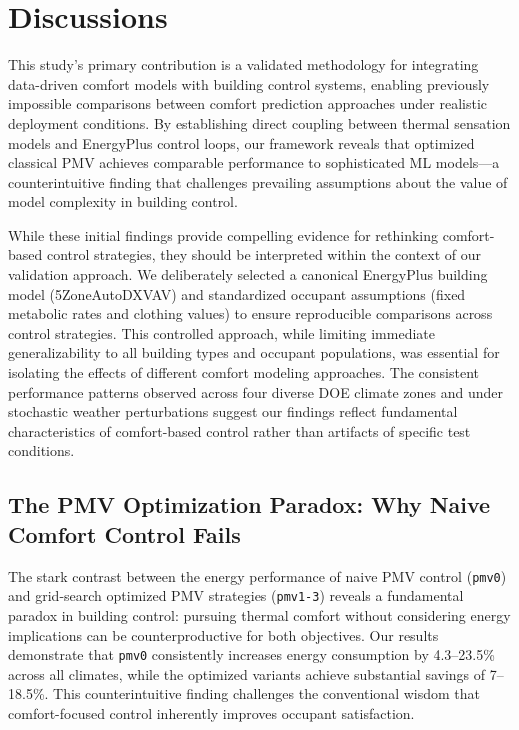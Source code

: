 \section{Discussions}
This study's primary contribution is a validated methodology for integrating data-driven comfort models with building control systems, enabling previously impossible comparisons between comfort prediction approaches under realistic deployment conditions. By establishing direct coupling between thermal sensation models and EnergyPlus control loops, our framework reveals that optimized classical PMV achieves comparable performance to sophisticated ML models—a counterintuitive finding that challenges prevailing assumptions about the value of model complexity in building control.

While these initial findings provide compelling evidence for rethinking comfort-based control strategies, they should be interpreted within the context of our validation approach. We deliberately selected a canonical EnergyPlus building model (5ZoneAutoDXVAV) and standardized occupant assumptions (fixed metabolic rates and clothing values) to ensure reproducible comparisons across control strategies. This controlled approach, while limiting immediate generalizability to all building types and occupant populations, was essential for isolating the effects of different comfort modeling approaches. The consistent performance patterns observed across four diverse DOE climate zones and under stochastic weather perturbations suggest our findings reflect fundamental characteristics of comfort-based control rather than artifacts of specific test conditions.

\subsection{The PMV Optimization Paradox: Why Naive Comfort Control Fails}

The stark contrast between the energy performance of naive PMV control (\texttt{pmv0}) and grid-search optimized PMV strategies (\texttt{pmv1-3}) reveals a fundamental paradox in building control: pursuing thermal comfort without considering energy implications can be counterproductive for both objectives. Our results demonstrate that \texttt{pmv0} consistently increases energy consumption by 4.3--23.5\% across all climates, while the optimized variants achieve substantial savings of 7--18.5\%. This counterintuitive finding challenges the conventional wisdom that comfort-focused control inherently improves occupant satisfaction.

